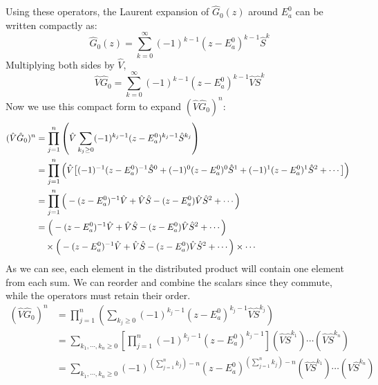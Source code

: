 Using these operators, the Laurent expansion of $\hat G_0(z)$ around
$E_a^0$ can be written compactly as:
\begin{equation} \label{eq:G0_laurent_kato}
  \hat G_0(z)=\sum_{k=0}^{\infty}(-1)^{k-1}(z-E_a^0)^{k-1} \hat S^k
\end{equation}
Multiplying both sides by $\hat V$,
\begin{equation}
  \hat V \hat G _{0} = \sum _{k=0}^{\infty} (-1) ^{k-1}(z - E
  _{a}^{0})^{k-1} \hat V \hat S ^{k}
\end{equation}
Now we use this compact form to expand $(\hat V \hat G_0)^n$:
\begin{align} \label{eq:V_G0_n_expansion}
  (\hat V \hat G_0)^n
  &=\prod_{j=1}^{n}\left(\hat V \sum_{k_j\ge
  0}(-1)^{k_j-1}(z-E_a^0)^{k_j-1}\hat S^{k_j}\right) \\
  &= \prod_{j=1}^{n} \Big( \hat V
    \big[(-1)^{-1}(z-E_a^{0})^{-1}\hat S^{0} +
      (-1)^{0}(z-E_a^{0})^{0}\hat S^{1} + (-1)^{1}(z-E_a^{0})^{1}\hat
  S^{2} + \cdots \big] \Big) \notag\ \\
  &= \prod_{j=1}^{n} \Big( -
    (z-E_a^{0})^{-1}\hat V + \hat V\hat
  S - (z-E_a^{0})\hat V\hat S^{2} + \cdots \Big) \\
  &= \Big( -
    (z-E_a^{0})^{-1}\hat V + \hat V\hat
  S - (z-E_a^{0})\hat V\hat S^{2} + \cdots \Big) \notag \\
  & \quad \times \Big( - (z-E_a^{0})^{-1}\hat V + \hat V\hat
  S - (z-E_a^{0})\hat V\hat S^{2} + \cdots \Big) \times \cdots
\end{align}
As we can see, each element in the distributed product will contain
one element from each sum. We can reorder and combine the scalars
since they commute, while the operators must retain their order.
\begin{align}
  (\hat V \hat G _{0})^{n}  &=\prod_{j=1}^{n}\left(\sum_{k_j\ge
  0}(-1)^{k_j-1}(z-E_a^0)^{k_j-1}\hat V \hat S^{k_j}\right) \\
  &=\sum_{k_1,\cdots,k_n\ge 0}
  \left[\prod_{j=1}^{n}(-1)^{k_j-1}(z-E_a^0)^{k_j-1}\right]
  (\hat V \hat S^{k_1})\cdots(\hat V \hat S^{k_n}) \\
  &=\sum_{k_1,\cdots,k_n\ge 0}
  (-1)^{\left(\sum_{j=1}^{n}k_j\right)-n}
  (z-E_a^0)^{\left(\sum_{j=1}^{n}k_j\right)-n}
  (\hat V \hat S^{k_1})\cdots(\hat V \hat S^{k_n})
\end{align}

